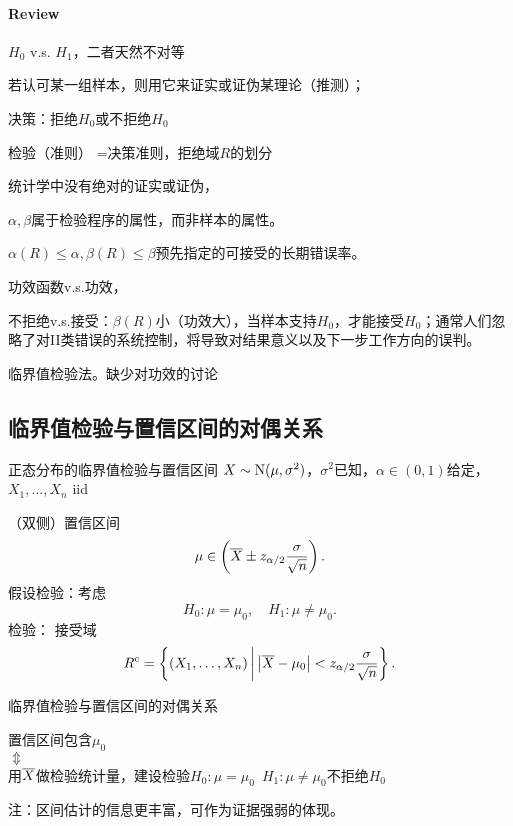 \paragraph{Review}
\begin{compactenum}
	\item $H_0$ v.s. $H_1$，二者天然不对等
	
	若认可某一组样本，则用它来证实或证伪某理论（推测）；
	\item 决策：拒绝$H_0$或不拒绝$H_0$
	
	检验（准则） =决策准则，拒绝域$R$的划分
	\item 统计学中没有绝对的证实或证伪，
	
	$\alpha,\beta$属于检验程序的属性，而非样本的属性。
	
	$\alpha(R)\leqslant\alpha,\beta(R)\leqslant\beta$预先指定的可接受的长期错误率。
	\item 功效函数v.s.功效，
	
	不拒绝v.s.接受：$\beta(R)$小（功效大），当样本支持$H_0$，才能接受$H_0$；通常人们忽略了对II类错误的系统控制，将导致对结果意义以及下一步工作方向的误判。
	\item 临界值检验法。缺少对功效的讨论
\end{compactenum}
\subsection{临界值检验与置信区间的对偶关系}
\begin{example}{正态分布的临界值检验与置信区间}{}
	$X\sim\operatorname{N}(\mu,\sigma^2)$，$\sigma^2$已知，$\alpha\in(0,1)$给定，$X_1,\ldots,X_n$ iid 

	（双侧）置信区间
	\[
		\mu\in\left(\overline X\pm z_{\alpha/2}\frac\sigma{\sqrt n}\right).
	\]
	假设检验：考虑
	\[
		H_0:\mu=\mu_0,\quad H_1:\mu\neq\mu_0.
	\]
	检验：%
	接受域
	\[
		R^\mathrm{c}=\left\{(X_1,\ldots,X_n)\,\middle\vert\,\left\lvert\overline X-\mu_0\right\rvert<z_{\alpha/2}\frac\sigma{\sqrt n}\right\}.
	\]
\end{example}
\begin{theorem}{临界值检验与置信区间的对偶关系}{}
	\begin{center}
		置信区间包含$\mu_0$\\
		$\Updownarrow$\\
		用$\overline X$做检验统计量，建设检验$H_0:\mu=\mu_0\enspace H_1:\mu\neq\mu_0$不拒绝$H_0$
	\end{center}
\end{theorem}
注：区间估计的信息更丰富，可作为证据强弱的体现。
